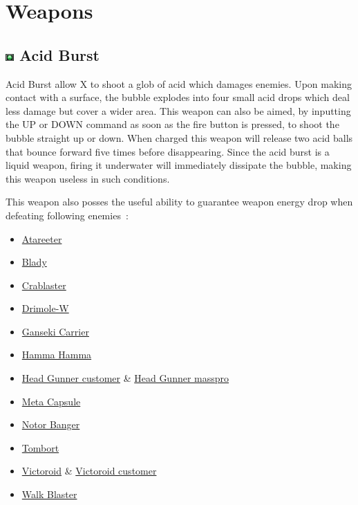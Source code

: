 \section{Weapons}\label{X3:sub_weapon}
\subsection{\includegraphics[width=12px, height=10px]{figures/X3/weapons/A_burst.jpg} Acid Burst}\label{Acid_Burst}
Acid Burst allow X to shoot a glob of acid which damages enemies. Upon making contact with a surface, the bubble explodes into four small acid drops which deal less damage but cover a wider area. This weapon can also be aimed, by inputting the UP or DOWN command as soon as the fire button is pressed, to shoot the bubble straight up or down. When charged this weapon will release two acid balls that bounce forward five times before disappearing. Since the acid burst is a liquid weapon, firing it underwater will immediately dissipate the bubble, making this weapon useless in such conditions. 

This weapon also posses the useful ability to guarantee weapon energy drop when defeating following enemies~\cite{X3:enem_drop_gfaqs}:
\begin{itemize}
	\item \hyperlink{enem:Atareeter}{Atareeter}
	\item \hyperlink{enem:Blady}{Blady}
	\item \hyperlink{enem:Crablaster}{Crablaster}
	\item \hyperlink{enem:Drimole-W}{Drimole-W }
	\item \hyperlink{enem:Ganseki_Carrier}{Ganseki Carrier}
	\item \hyperlink{enem:Hamma_Hamma}{Hamma Hamma}
	\item \hyperlink{enem:Head_Gunner_customer}{Head Gunner customer} \& \hyperlink{enem:Head_Gunner_masspro}{Head Gunner masspro}
	\item \hyperlink{enem:Meta_Capsule}{Meta Capsule}
	\item \hyperlink{enem:Notor_Banger}{Notor Banger}
	\item \hyperlink{enem:Tombort}{Tombort}
	\item \hyperlink{enem:Victoroid}{Victoroid} \& \hyperlink{enem:Victoroid_customer}{Victoroid customer}
	\item \hyperlink{enem:Walk_Blaster}{Walk Blaster}
\end{itemize}

